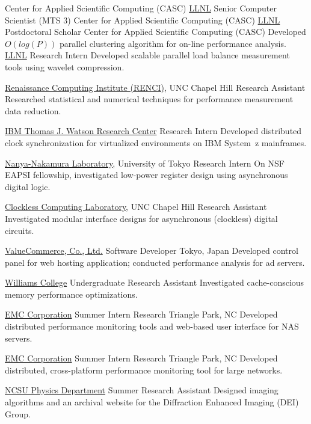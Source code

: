 		{Center for Applied Scientific Computing (CASC)}
                {}{}
		{\href{http://www.llnl.gov}{LLNL}}
		{Senior Computer Scientist (MTS 3)}
		{Center for Applied Scientific Computing (CASC)}
                {}{}
		{\href{http://www.llnl.gov}{LLNL}}
		{Postdoctoral Scholar}
		{Center for Applied Scientific Computing (CASC)}{}
		{Developed $O(log(P))$ parallel clustering algorithm for on-line performance analysis.
		 }
		{\href{http://www.llnl.gov}{LLNL}}
		{Research Intern}
		{}{}
		{Developed scalable parallel load balance measurement tools using wavelet compression.}

		{\href{http://www.renci.org}{Renaissance Computing Institute (RENCI)}, UNC Chapel Hill}
		{Research Assistant}
		{}{}
		{Researched statistical and numerical techniques for performance measurement data reduction.}

		{\href{http://www.watson.ibm.com}{IBM Thomas J. Watson Research Center}}
		{Research Intern}
		{}{}
		{Developed distributed clock synchronization for virtualized environments on IBM System~z mainframes.}

		{\href{http://www.hal.rcast.u-tokyo.ac.jp/}{Nanya-Nakamura Laboratory}, University of Tokyo}
		{Research Intern}
		{}{}
		{On NSF EAPSI fellowship, investigated low-power register design using asynchronous digital logic.}

		{\href{http://www.cs.unc.edu/~montek/}{Clockless Computing Laboratory}, UNC Chapel Hill}
		{Research Assistant}
		{}{}
		{Investigated modular interface designs for asynchronous (clockless) digital circuits.}

		{\href{http://valuecommerce.com}{ValueCommerce, Co., Ltd.}}
		{Software Developer}
		{Tokyo, Japan}{}
		{Developed control panel for web hosting application; conducted
		 performance analysis for ad servers.}

		{\href{http://www.williams.edu}{Williams College}}
		{Undergraduate Research Assistant}
		{}{}
		{Investigated cache-conscious memory performance optimizations.}

		{\href{http://www.emc.com}{EMC Corporation}}
		{Summer Intern}
		{Research Triangle Park, NC}{}
		{Developed distributed performance monitoring tools and
		 web-based user interface for NAS servers.}

		{\href{http://www.emc.com}{EMC Corporation}}
		{Summer Intern}
		{Research Triangle Park, NC}{}
		{Developed distributed, cross-platform performance monitoring tool
		 for large networks.}

		{\href{http://physics.ncsu.edu/}{NCSU Physics Department}}
		{Summer Research Assistant}
		{}{}
		{Designed imaging algorithms and an archival website for the Diffraction
		 Enhanced Imaging (DEI) Group.}
